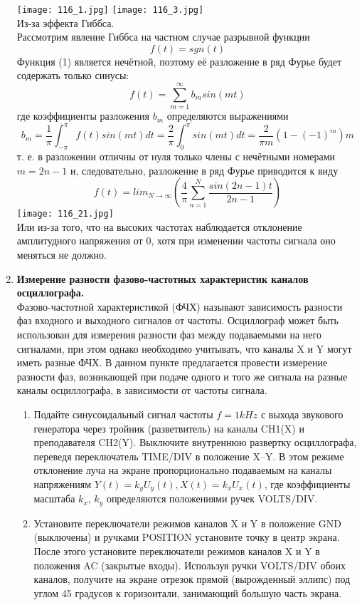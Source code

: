 \documentclass[a4paper, 12pt]{article}%
\begin{document}
\begin{enumerate}
	\texttt{[image: 116\_1.jpg]}
	\texttt{[image: 116\_3.jpg]}\\
	Из-за эффекта Гиббса. \\
	Рассмотрим явление Гиббса на частном случае разрывной функции\\
	\[f(t) = sgn(t)\]
	Функция (1) является нечётной, поэтому её разложение в ряд Фурье будет содержать только синусы:
	\[f(t) = \sum_{m = 1}^{\infty}b_m sin(mt)\]
	где коэффициенты разложения $b_m$ определяются выражениями
	\[b_m = \dfrac{1}{\pi} \int_{- \pi}^{\pi} f(t) sin (mt) dt = \dfrac{2}{\pi} \int_0^{\pi} sin (mt) dt = \dfrac{2}{\pi m} (1-(-1)^m)m \]
	т. е. в разложении отличны от нуля только члены с нечётными номерами $m = 2n - 1$ и, следовательно, разложение в ряд Фурье приводится к виду
	\[f(t) = lim_{N \longrightarrow \infty} \left(\dfrac{4}{\pi} \sum_{n = 1}^N \dfrac{sin(2n-1)t}{2n-1} \right)\]
	\texttt{[image: 116\_21.jpg]} \\
	Или из-за того, что на высоких частотах наблюдается отклонение амплитудного напряжения от 0, хотя при изменении частоты сигнала оно меняться не должно. 
	\item \textbf{Измерение разности фазово-частотных характеристик каналов осциллографа.}\\ Фазово-частотной характеристикой (ФЧХ) называют зависимость разности фаз входного и выходного сигналов от частоты. Осциллограф может быть использован для измерения разности фаз между подаваемыми на него сигналами, при этом однако необходимо учитывать, что каналы X и Y могут иметь разные ФЧХ. В данном пункте предлагается провести измерение разности фаз, возникающей при подаче одного и того же сигнала на разные каналы осциллографа, в зависимости от частоты сигнала.
	\begin{enumerate}
		\item Подайте синусоидальный сигнал частоты $f = 1 kHz$ с выхода звукового генератора через тройник (разветвитель) на каналы CH1(X) и преподавателя CH2(Y). Выключите внутреннюю развертку осциллографа, переведя переключатель TIME/DIV в положение X–Y. В этом режиме отклонение луча на экране пропорционально подаваемым на каналы напряжениям $ Y(t) =  k_yU_y(t), X(t) = k_xU_x(t)$, где коэффициенты масштаба $k_x$, $k_y$ определяются положениями ручек VOLTS/DIV.
		\item Установите переключатели режимов каналов X и Y в положение GND (выключены) и ручками POSITION установите точку в центр экрана. После этого установите переключатели режимов каналов X и Y в положения AC (закрытые входы). Используя ручки VOLTS/DIV обоих каналов, получите на экране отрезок прямой (вырожденный эллипс) под углом 45 градусов к горизонтали, занимающий большую часть экрана.\\

\end{enumerate}
\end{enumerate}
\end{document}
